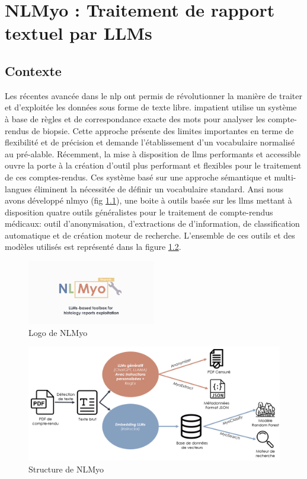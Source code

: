 \chapter{NLMyo : Traitement de rapport textuel par LLMs}

\section{Contexte}
Les récentes avancée dans le \gls{nlp} ont permis de révolutionner la manière de traiter et d'exploitée les données sous forme de texte libre. \gls{impatient} utilise un système à base de règles et de correspondance exacte des mots pour analyser les compte-rendus de biopsie. Cette approche présente des limites importantes en terme de flexibilité et de précision et demande l'établissement d'un vocabulaire normalisé au pré-alable. 
Récemment, la mise à disposition de \gls{llms} performants et accessible ouvre la porte à la création d'outil plus performant et flexibles pour le traitement de ces comptes-rendus. Ces système basé sur une approche sémantique et multi-langues éliminent la nécessitée de définir un vocabulaire standard. Ansi nous avons développé \gls{nlmyo} (fig \ref{fig:nlmyo_logo}), une boite à outils basée sur les \gls{llms} mettant à disposition quatre outils généralistes pour le traitement de compte-rendus médicaux: outil d'anonymisation, d'extractions de d'information, de classification automatique et de création moteur de recherche. L'ensemble de ces outils et des modèles utilisés est représenté dans la figure \ref{fig:nlmyo_struct}.
\begin{figure}[htbp]
  \centering
  \includegraphics[width=0.5\textwidth]{figures/nlmyo_banner.png}
  \caption[Logo NLMyo]{Logo de NLMyo}
  \label{fig:nlmyo_logo}
\end{figure}
\begin{figure}[htbp]
  \centering
  \includegraphics[width=1\textwidth]{figures/nlmyo_struct.png}
  \caption[Structure de NLMyo]{Structure de NLMyo}
  \label{fig:nlmyo_struct}
\end{figure}
